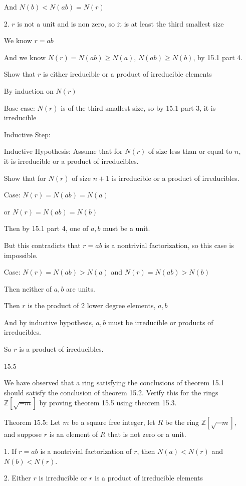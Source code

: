 \documentclass[12pt]{article}
\begin{document}
\begin{itemize}
	And $N(b) < N(ab) = N(r)$

	2. $r$ is not a unit and is non zero, so it is at least the third smallest size

	We know $r = ab$

	And we know $N(r) = N(ab) \geq N(a)$, $N(ab) \geq N(b)$, by 15.1 part 4.

	Show that $r$ is either ireducible or a product of irreducible elements

	By induction on $N(r)$

	Base case: $N(r)$ is of the third smallest size, so by 15.1 part 3, it is irreducible

	Inductive Step:

	Inductive Hypothesis: Assume that for $N(r)$ of size less than or equal to $n$, it is irreducible or a product of irreducibles.

	Show that for $N(r)$ of size $n+1$ is irreducible or a product of irreducibles.

	Case: $N(r) = N(ab) = N(a)$

	or $N(r) = N(ab) = N(b)$

	Then by 15.1 part 4, one of $a,b$ must be a unit.

	But this contradicts that $r = ab$ is a nontrivial factorization, so this case is impossible.

	Case: $N(r) = N(ab) > N(a)$ and $N(r) = N(ab) > N(b)$

	Then neither of $a,b$ are units. 

	Then $r$ is the product of 2 lower degree elements, $a,b$

	And by inductive hypothesis, $a,b$ must be irreducible or products of irreducibles.

	So $r$ is a product of irreducibles.


\newpage 
\item[15.5]

	We have observed that a ring satisfying the conclusions of theorem 15.1 should satisfy the conclusion of theorem 15.2. Verify this for the rings $\mathbb{Z}[\sqrt{-m}]$ by proving theorem 15.5 using theorem 15.3.

	Theorem 15.5:	Let $m$ be a square free integer, let $R$ be the ring $\mathbb{Z}[\sqrt{-m}]$, and suppose $r$ is an element of $R$ that is not zero or a unit.

	1. If $r = ab$ is a nontrivial factorization of $r$, then $N(a) < N(r)$ and $N(b) < N(r)$.

	2. Either $r$ is irreducible or $r$ is a product of irreducible elements


\end{itemize}
\end{document}
